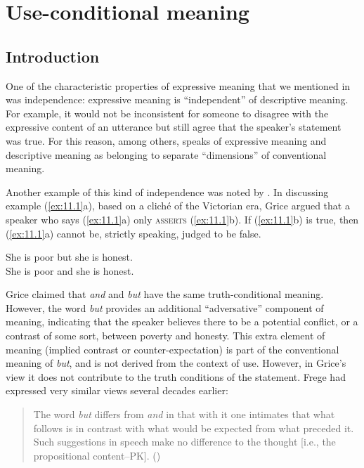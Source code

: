 \chapter{Use-conditional meaning}\label{sec:11}

\section{Introduction}\label{sec:11.1}

One of the characteristic properties of expressive meaning that we mentioned in  was independence: expressive meaning is “independent” of descriptive meaning. For example, it would not be inconsistent for someone to disagree with the expressive content of an utterance but still agree that the speaker’s statement was true. For this reason, among others, \citet{Potts2007c} speaks of expressive meaning and descriptive meaning as belonging to separate “dimensions” of conventional meaning.


Another example of this kind of independence was noted by \citet{Grice1961}. In discussing example (\ref{ex:11.1}a), based on a cliché of the Victorian era, Grice argued that a speaker who says (\ref{ex:11.1}a) only \textsc{asserts} (\ref{ex:11.1}b). If (\ref{ex:11.1}b) is true, then (\ref{ex:11.1}a) cannot be, strictly speaking, judged to be false.



\ea \label{ex:11.1}
\ea She is poor but she is honest.\\
\ex She is poor and she is honest.  \citep[127]{Grice1961}
                       \z
\z

\begin{sloppypar}
Grice claimed that \textit{and} and \textit{but} have the same truth-conditional meaning. However, the word \textit{but} provides an additional “adversative” component of meaning, indicating that the speaker believes there to be a potential conflict, or a contrast of some sort, between poverty and honesty. This extra element of meaning (implied contrast or counter-expectation) is part of the conventional meaning of \textit{but}, and is not derived from the context of use. However, in Grice’s view it does not contribute to the truth conditions of the statement. Frege had expressed very similar views several decades earlier:
\end{sloppypar}


\begin{quote}
The word \textit{but} differs from \textit{and} in that with it one intimates that what follows is in contrast with what would be expected from what preceded it. Such suggestions in speech make no difference to the thought [i.e., the propositional content–PK].   (\citealt{Frege1918})
\end{quote}\pagebreak



